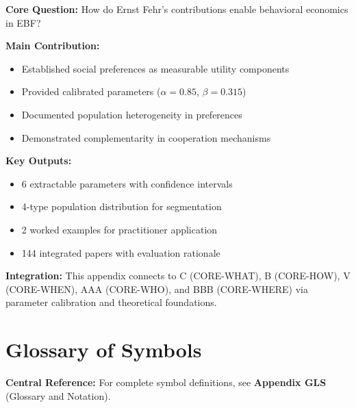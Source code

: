 \begin{tcolorbox}[colback=green!10!white, colframe=green!75!black,
    title=\textbf{Appendix FEH: Summary}]

\textbf{Core Question:} How do Ernst Fehr's contributions enable behavioral
economics in EBF?

\textbf{Main Contribution:}
\begin{itemize}[nosep]
    \item Established social preferences as measurable utility components
    \item Provided calibrated parameters ($\alpha=0.85$, $\beta=0.315$)
    \item Documented population heterogeneity in preferences
    \item Demonstrated complementarity in cooperation mechanisms
\end{itemize}

\textbf{Key Outputs:}
\begin{itemize}[nosep]
    \item 6 extractable parameters with confidence intervals
    \item 4-type population distribution for segmentation
    \item 2 worked examples for practitioner application
    \item 144 integrated papers with evaluation rationale
\end{itemize}

\textbf{Integration:} This appendix connects to C (CORE-WHAT), B (CORE-HOW),
V (CORE-WHEN), AAA (CORE-WHO), and BBB (CORE-WHERE) via parameter calibration
and theoretical foundations.

\end{tcolorbox}


\section{Glossary of Symbols}
\label{sec:feh-glossary}

\begin{tcolorbox}[colback=blue!5!white, colframe=blue!75!black]
\textbf{Central Reference:} For complete symbol definitions, see
\textbf{Appendix GLS} (Glossary and Notation).
\end{tcolorbox}

